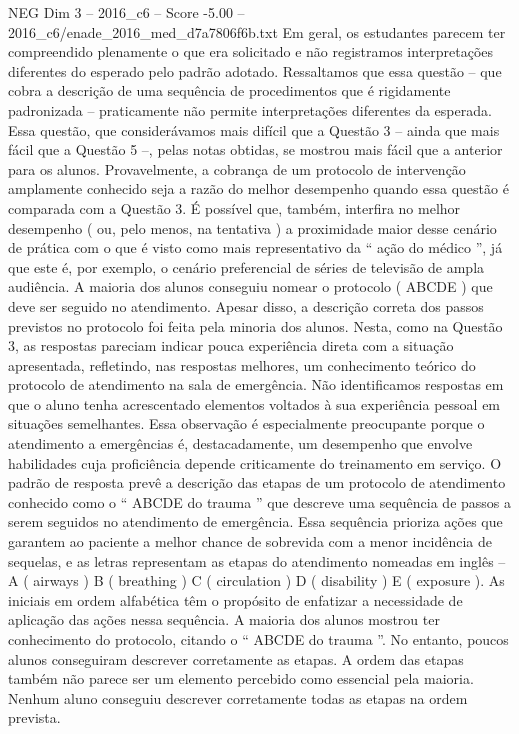 \begin{textsample}{NEG Dim 3 – 2016\_c6 – Score -5.00 – 2016\_c6/enade\_2016\_med\_d7a7806f6b.txt}
Em geral, os estudantes parecem ter compreendido plenamente o que era solicitado e não registramos interpretações diferentes do esperado pelo padrão adotado.
Ressaltamos que essa questão – que cobra a descrição de uma sequência de procedimentos que é rigidamente padronizada – praticamente não permite interpretações diferentes da esperada.
Essa questão, que considerávamos mais difícil que a Questão 3 – ainda que mais fácil que a Questão 5 –, pelas notas obtidas, se mostrou mais fácil que a anterior para os alunos.
Provavelmente, a cobrança de um protocolo de intervenção amplamente conhecido seja a razão do melhor desempenho quando essa questão é comparada com a Questão 3.
É possível que, também, interfira no melhor desempenho ( ou, pelo menos, na tentativa ) a proximidade maior desse cenário de prática com o que é visto como mais representativo da “ ação do médico ”, já que este é, por exemplo, o cenário preferencial de séries de televisão de ampla audiência.
A maioria dos alunos conseguiu nomear o protocolo ( ABCDE ) que deve ser seguido no atendimento.
Apesar disso, a descrição correta dos passos previstos no protocolo foi feita pela minoria dos alunos.
Nesta, como na Questão 3, as respostas pareciam indicar pouca experiência direta com a situação apresentada, refletindo, nas respostas melhores, um conhecimento teórico do protocolo de atendimento na sala de emergência.
Não identificamos respostas em que o aluno tenha acrescentado elementos voltados à sua experiência pessoal em situações semelhantes.
Essa observação é especialmente preocupante porque o atendimento a emergências é, destacadamente, um desempenho que envolve habilidades cuja proficiência depende criticamente do treinamento em serviço.
O padrão de resposta prevê a descrição das etapas de um protocolo de atendimento conhecido como o “ ABCDE do trauma ” que descreve uma sequência de passos a serem seguidos no atendimento de emergência.
Essa sequência prioriza ações que garantem ao paciente a melhor chance de sobrevida com a menor incidência de sequelas, e as letras representam as etapas do atendimento nomeadas em inglês – A ( airways ) B ( breathing ) C ( circulation ) D ( disability ) E ( exposure ).
As iniciais em ordem alfabética têm o propósito de enfatizar a necessidade de aplicação das ações nessa sequência.
A maioria dos alunos mostrou ter conhecimento do protocolo, citando o “ ABCDE do trauma ”.
No entanto, poucos alunos conseguiram descrever corretamente as etapas.
A ordem das etapas também não parece ser um elemento percebido como essencial pela maioria.
Nenhum aluno conseguiu descrever corretamente todas as etapas na ordem prevista.

\end{textsample}
